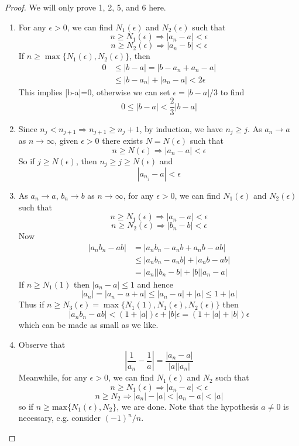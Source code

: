 \documentclass[10pt, a4paper, twoside]{report}
\begin{document}
\begin{proof}
    We will only prove 1, 2, 5, and 6 here.
    \begin{enumerate}
        \item For any \(\epsilon>0\), we can find \(N_1(\epsilon)\) and \(N_2(\epsilon)\) such that
        \[n\geq N_1(\epsilon)\Rightarrow|a_n-a|<\epsilon\]
        \[n\geq N_2(\epsilon)\Rightarrow|a_n-b|<\epsilon\]
        If \(n\geq\max\{N_1(\epsilon),N_2(\epsilon)\}\), then
        \begin{align*}
            0&\leq|b-a|=|b-a_n+a_n-a| \\
            &\leq|b-a_n|+|a_n-a|<2\epsilon
        \end{align*}
        This implies |b-a|=0, otherwise we can set \(\epsilon=|b-a|/3\) to find
        \[0\leq|b-a|<\frac 23|b-a|\]
        \hfill\qedsymbol
        \item Since \(n_j<n_{j+1}\Rightarrow n_{j+1}\geq n_j+1\), by induction, we have \(n_j\geq j\). As \(a_n\to a\) as \(n\to\infty\), given \(\epsilon>0\) there exists \(N=N(\epsilon)\) such that 
        \[n\geq N(\epsilon)\Rightarrow|a_n-a|<\epsilon\]
        So if \(j\geq N(\epsilon)\), then \(n_j\geq j\geq N(\epsilon)\) and 
        \[|a_{n_j}-a|<\epsilon\]
        \hfill\qedsymbol
        \item As \(a_n\to a\), \(b_n\to b\) as \(n\to\infty\), for any \(\epsilon>0\), we can find \(N_1(\epsilon)\) and \(N_2(\epsilon)\) such that
        \[n\geq N_1(\epsilon)\Rightarrow|a_n-a|<\epsilon\]
        \[n\geq N_2(\epsilon)\Rightarrow|b_n-b|<\epsilon\]
        Now
        \begin{align*}
            |a_nb_n-ab|&=|a_nb_n-a_nb+a_nb-ab| \\
            &\leq|a_nb_n-a_nb|+|a_nb-ab| \\
            &=|a_n||b_n-b|+|b||a_n-a|
        \end{align*}
        If \(n\geq N_1(1)\) then \(|a_n-a|\leq 1\) and hence
        \[|a_n|=|a_n-a+a|\leq |a_n-a|+|a|\leq 1+|a|\]
        Thus if \(n\geq N_3(\epsilon)=\max\{N_1(1),N_1(\epsilon),N_2(\epsilon)\}\) then
        \[|a_nb_n-ab|<(1+|a|)\epsilon+|b|\epsilon=(1+|a|+|b|)\epsilon\]
        which can be made as small as we like.
        \item Observe that 
        \[\left|\frac 1{a_n}-\frac 1a\right|=\frac{|a_n-a|}{|a||a_n|}\]
        Meanwhile, for any \(\epsilon>0\), we can find \(N_1(\epsilon)\) and \(N_2\) such that
        \[n\geq N_1(\epsilon)\Rightarrow|a_n-a|<\epsilon\]
        \[n\geq N_2\Rightarrow|a_n|-|a|<|a_n-a|<|a|\]
        so if \(n\geq\text{max}\{N_1(\epsilon),N_2\}\), we are done. Note that the hypothesis \(a\neq 0\) is necessary, e.g. consider \((-1)^n/n\).
        \hfill\qedsymbol
    \end{enumerate}
\end{proof}
\end{document}
